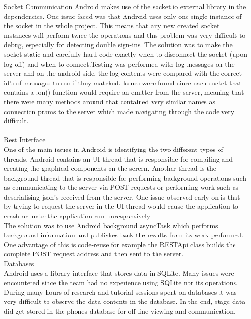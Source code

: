 \documentclass{article}
\begin{document}
\begin{enumerate}
	\underline{Socket Communication}\newline
	Android makes use of the socket.io external library in the dependencies. One issue faced was that Android uses only one single instance of the socket in the whole project. This means that any new created socket instances will perform twice the operations and this problem was very difficult to debug, especially for detecting double sign-ins. The solution was to make the socket static and carefully hard-code exactly when to disconnect the socket (upon log-off) and when to connect.Testing was performed with log messages on the server and on the android side, the log contents were compared with the correct id's of messages to see if they matched. Issues were found since each socket that contains a .on() function would require an emitter from the server, meaning that there were many methods around that contained very similar names as connection prams to the server which made navigating through the code very difficult.\\ \\
	\underline{Rest Interface}\\
	One of the main issues in Android is identifying the two different types of threads. Android contains an UI thread that is responsible for compiling and creating the graphical components on the screen. Another thread is the background thread that is responsible for performing background operations such as communicating to the server via POST requests or performing work such as deserialising json's received from the server. One issue observed early on is that by trying to request the server in the UI thread would cause the application to crash or make the application run unresponsively.\\ The solution was to use Android background asyncTask which performs background information and publishes back the results from its work performed. One advantage of this is code-reuse for example the RESTApi class builds the complete POST request address and then sent to the server. \\
	\underline{Databases}\\
	Android uses a library interface that stores data in SQLite. Many issues were encountered since the team had no experience using SQLite nor its operations. During many hours of research and tutorial sessions spent on databases it was very difficult to observe the data contents in the database. In the end, stage data did get stored in the phones database for off line viewing and communication. \par
	

\end{enumerate}
\end{document}
